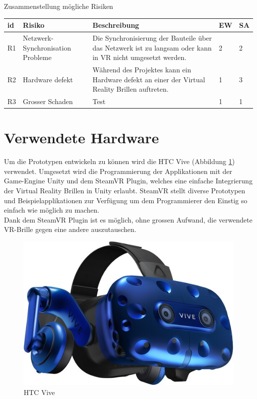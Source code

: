 Zusammenstellung mögliche Risiken
\begin{center}
	\begin{tabularx}{\textwidth} { |l|l|X|l|l| }
		\hline
		\rowcolor{black}
		\color{white} \textbf{id} & \color{white} \textbf{Risiko} & \color{white} \textbf{Beschreibung} & \color{white} \textbf{EW} & \color{white} \textbf{SA} \\
		\hline
		R1 & Netzwerk-Synchronisation Probleme & Die Synchronisierung der Bauteile über das Netzwerk ist zu langsam oder kann in VR nicht umgesetzt werden. & 2 & 2 \\
		\hline
		R2 & Hardware defekt & Während des Projektes kann ein Hardware defekt an einer der Virtual Reality Brillen auftreten. & 1 & 3 \\
		\hline
		R3 & Grosser Schaden & Test & 1 & 1 \\
		\hline
	\end{tabularx}
\end{center}
\label{tbl:risiken_vorher}



\section{Verwendete Hardware}
Um die Prototypen entwickeln zu können wird die HTC Vive (Abbildung \ref{fig:htc_vive}) verwendet. Umgesetzt wird die Programmierung der Applikationen mit der Game-Engine Unity und dem SteamVR Plugin, welches eine einfache Integrierung der Virtual Reality Brillen in Unity erlaubt. SteamVR stellt diverse Prototypen und Beispielapplikationen zur Verfügung um dem Programmierer den Einstig so einfach wie möglich zu machen. \\
Dank dem SteamVR Plugin ist es möglich, ohne grossen Aufwand, die verwendete VR-Brille gegen eine andere auszutauschen.
\begin{figure}[h!]
	\centering
	\includegraphics[keepaspectratio,width=0.4\linewidth]{img/Vive_Pro.jpg}
	\caption{HTC Vive}
	\label{fig:htc_vive}
\end{figure}